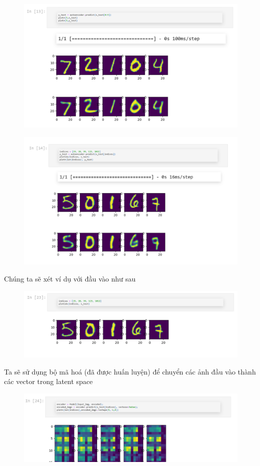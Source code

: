 \documentclass{book}
\begin{document}
\begin{figure}[H]
	\centering
	\includegraphics[width=0.75\linewidth]{images/au6.png}
\end{figure}
\begin{figure}[H]
	\centering
	\includegraphics[width=0.75\linewidth]{images/au7.png}
\end{figure}

Chúng ta sẽ xét ví dụ với đầu vào như sau
\begin{figure}[H]
	\centering
	\includegraphics[width=0.75\linewidth]{images/au8.png}
\end{figure}

Ta sẽ sử dụng bộ mã hoá (đã được huấn luyện) để chuyển các ảnh đầu vào thành các vector trong latent space
\begin{figure}[H]
	\centering
	\includegraphics[width=0.75\linewidth]{images/au9.png}
\end{figure}
\end{document}
